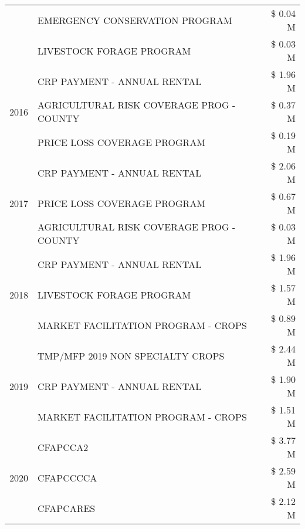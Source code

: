 \begin{tabular}{llr}
 & EMERGENCY CONSERVATION PROGRAM & \$ 0.04 M \\
 & LIVESTOCK FORAGE PROGRAM & \$ 0.03 M \\
\cline{1-3}
\multirow[t]{3}{*}{2016} & CRP PAYMENT - ANNUAL RENTAL & \$ 1.96 M \\
 & AGRICULTURAL RISK COVERAGE PROG - COUNTY & \$ 0.37 M \\
 & PRICE LOSS COVERAGE PROGRAM & \$ 0.19 M \\
\cline{1-3}
\multirow[t]{3}{*}{2017} & CRP PAYMENT - ANNUAL RENTAL & \$ 2.06 M \\
 & PRICE LOSS COVERAGE PROGRAM & \$ 0.67 M \\
 & AGRICULTURAL RISK COVERAGE PROG - COUNTY & \$ 0.03 M \\
\cline{1-3}
\multirow[t]{3}{*}{2018} & CRP PAYMENT - ANNUAL RENTAL & \$ 1.96 M \\
 & LIVESTOCK FORAGE PROGRAM & \$ 1.57 M \\
 & MARKET FACILITATION PROGRAM - CROPS & \$ 0.89 M \\
\cline{1-3}
\multirow[t]{3}{*}{2019} & TMP/MFP 2019 NON SPECIALTY CROPS & \$ 2.44 M \\
 & CRP PAYMENT - ANNUAL RENTAL & \$ 1.90 M \\
 & MARKET FACILITATION PROGRAM - CROPS & \$ 1.51 M \\
\cline{1-3}
\multirow[t]{3}{*}{2020} & CFAPCCA2 & \$ 3.77 M \\
 & CFAPCCCCA & \$ 2.59 M \\
 & CFAPCARES & \$ 2.12 M \\
\cline{1-3}
\bottomrule
\end{tabular}
